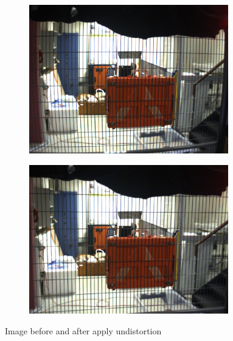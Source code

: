 	\begin{figure}[!ht]
		\centering
		\begin{subfigure}{.49\textwidth}
		  \centering
		  \includegraphics[width=0.95\textwidth]{figures/distorted}
		\end{subfigure}%
		\begin{subfigure}{.49\textwidth}
		  \centering
		  \includegraphics[width=0.95\textwidth]{figures/undistorted}
		\end{subfigure}
		\caption{Image before and after apply undistortion}
		\label{fig:undistorsion}
	\end{figure}


